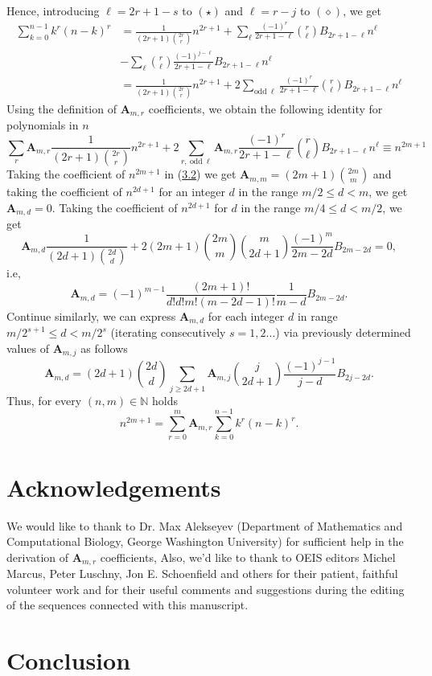 \documentclass[12pt, letterpaper]{amsart}
\theoremstyle{definition}
\theoremstyle{remark}
\numberwithin{equation}{section}
\begin{document}
Hence, introducing $\ell=2r+1-s$ to $(\star)$ and $\ell=r-j$ to $(\diamond)$, we get
\begin{equation*}
\begin{split}
\sum_{k=0}^{n-1}k^r(n-k)^r
&=\frac{1}{(2r+1)\binom{2r}r}n^{2r+1}+\sum_{\ell}\frac{(-1)^r}{2r+1-\ell}\binom{r}{\ell}B_{2r+1-\ell}n^{\ell}\\
&-\sum_{\ell} \binom{r}{\ell}\frac{(-1)^{j-\ell}}{2r+1-\ell}B_{2r+1-\ell}n^{\ell}\\
&=\frac{1}{(2r+1)\binom{2r}r}n^{2r+1}+2\sum_{\mathrm{odd} \ \ell}\frac{(-1)^r}{2r+1-\ell}\binom{r}{\ell}B_{2r+1-\ell}n^{\ell}
\end{split}
\end{equation*}
Using the definition of $\mathbf{A}_{m,r}$ coefficients, we obtain the following identity for polynomials in $n$
\begin{equation}\label{proof2}
\sum_{r}\mathbf{A}_{m,r}\frac{1}{(2r+1)\binom{2r}r}n^{2r+1}
+2\sum_{r, \ \mathrm{odd} \ \ell}\mathbf{A}_{m,r}\frac{(-1)^r}{2r+1-\ell}\binom{r}{\ell}B_{2r+1-\ell}n^{\ell}\equiv n^{2m+1}
\end{equation}
Taking the coefficient of $n^{2m+1}$ in (\hyperref[proof2]{3.2}) we get $\mathbf{A}_{m,m}=(2m+1)\binom{2m}m$ and taking the coefficient of $n^{2d+1}$ for an integer $d$ in the range $m/2 \leq d < m$, we get $\mathbf{A}_{m,d}=0$. Taking the coefficient of $n^{2d+1}$ for $d$ in the range $m/4 \leq d < m/2$, we get
\begin{equation*}
\mathbf{A}_{m,d} \frac{1}{(2d+1)\binom{2d}{d}} + 2 (2m+1) \binom{2m}{m} \binom{m}{2d+1} \frac{(-1)^m}{2m-2d} B_{2m-2d} = 0,
\end{equation*}
i.e,
\begin{equation*}
\mathbf{A}_{m,d} = (-1)^{m-1} \frac{(2m+1)!}{d!d!m!(m-2d-1)!}\frac{1}{m-d} B_{2m-2d}.
\end{equation*}
Continue similarly, we can express $\mathbf{A}_{m,d}$ for each integer $d$ in range $m/2^{s+1}\leq d< m/2^s$ (iterating consecutively $s=1,2...$) via previously determined values of $\mathbf{A}_{m,j}$ as follows
\begin{equation*}
\mathbf{A}_{m,d} = (2d+1)\binom{2d}{d} \sum_{j\geq 2d+1} \mathbf{A}_{m,j} \binom{j}{2d+1} \frac{(-1)^{j-1}}{j-d} B_{2j-2d}.
\end{equation*}
Thus, for every $(n,m)\in\mathbb{N}$ holds
\begin{equation*}
n^{2m+1}=\sum_{r=0}^{m}\mathbf{A}_{m,r}\sum_{k=0}^{n-1}k^r(n-k)^r.
\end{equation*}
\section{Acknowledgements}
We would like to thank to Dr. Max Alekseyev (Department of Mathematics and Computational Biology,
George Washington University) for sufficient help in the derivation of $\mathbf{A}_{m,r}$ coefficients,
Also, we'd like to thank to OEIS editors Michel Marcus, Peter Luschny, Jon E. Schoenfield and others
for their patient, faithful volunteer work and for their useful comments and suggestions during
the editing of the sequences connected with this manuscript.
\section{Conclusion}


\end{document}
